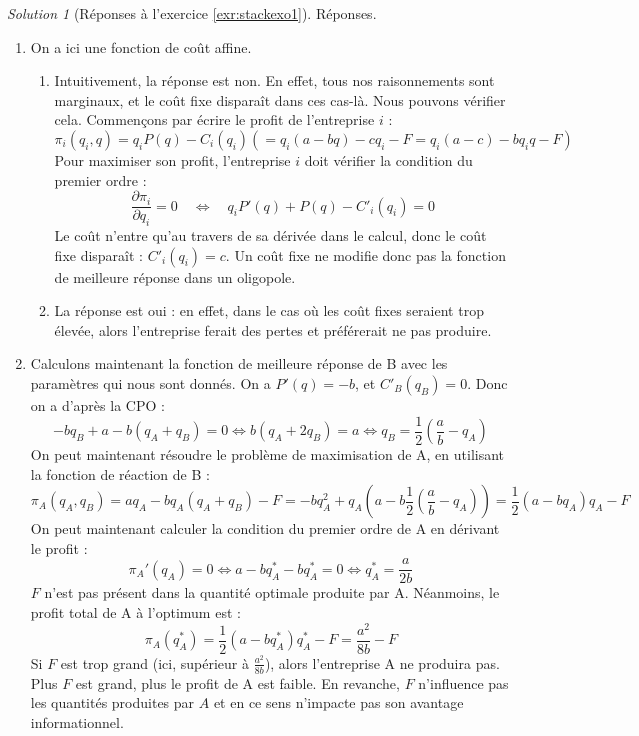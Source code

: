 \documentclass[
]{book}
\providecommand{\tightlist}{%
  \setlength{\itemsep}{0pt}\setlength{\parskip}{0pt}}
\theoremstyle{definition}
\theoremstyle{definition}
\theoremstyle{definition}
\theoremstyle{definition}
\theoremstyle{remark}
\newtheorem*{solution}{Solution}
\begin{document}
\begin{solution}[Réponses à l'exercice \ref{exr:stackexo1}]

Réponses.

\begin{enumerate}
\def\labelenumi{\arabic{enumi}.}
\tightlist
\item
  On a ici une fonction de coût affine.

  \begin{enumerate}
  \def\labelenumii{\alph{enumii}.}
  \tightlist
  \item
    Intuitivement, la réponse est non.
    En effet, tous nos raisonnements sont marginaux, et le coût fixe disparaît dans ces cas-là.
    Nous pouvons vérifier cela.
    Commençons par écrire le profit de l'entreprise \(i\) :
    \[\pi_i(q_i, q)=q_iP(q)-C_i(q_i)(=q_i(a-bq)-cq_i-F=q_i(a-c)-bq_iq-F)\]
    Pour maximiser son profit, l'entreprise \(i\) doit vérifier la condition du premier ordre :
    \[\frac{\partial\pi_i}{\partial q_i}=0\quad \Leftrightarrow \quad q_iP'(q)+P(q)-C'_i(q_i)=0\]
    Le coût n'entre qu'au travers de sa dérivée dans le calcul, donc le coût fixe disparaît : \(C'_i(q_i)=c\).
    Un coût fixe ne modifie donc pas la fonction de meilleure réponse dans un oligopole.
  \item
    La réponse est oui : en effet, dans le cas où les coût fixes seraient trop élevée, alors l'entreprise ferait des pertes et préférerait ne pas produire.
  \end{enumerate}
\item
  Calculons maintenant la fonction de meilleure réponse de B avec les paramètres qui nous sont donnés.
  On a \(P'(q)=-b\), et \(C'_B(q_B)=0\).
  Donc on a d'après la CPO :
  \[-bq_B+a-b(q_A+q_B)=0\Leftrightarrow b(q_A+2q_B)=a\Leftrightarrow q_B=\frac{1}{2}\left(\frac{a}{b}-q_A\right)\]
  On peut maintenant résoudre le problème de maximisation de A, en utilisant la fonction de réaction de B :
  \[\pi_A(q_A, q_B)=aq_A-bq_A(q_A+q_B)-F=-bq_A^2+q_A\left(a-b\frac{1}{2}\left(\frac{a}{b}-q_A\right)\right)=\frac{1}{2}(a-bq_A)q_A-F\]
  On peut maintenant calculer la condition du premier ordre de A en dérivant le profit :
  \[\pi_A'(q_A)=0 \Leftrightarrow  a-bq_A^*-bq_A^*=0\Leftrightarrow q_A^*=\frac{a}{2b}\]
  \(F\) n'est pas présent dans la quantité optimale produite par A.
  Néanmoins, le profit total de A à l'optimum est :
  \[\pi_A(q_A^*)=\frac{1}{2}(a-bq_A^*)q_A^*-F=\frac{a^2}{8b}-F\]
  Si \(F\) est trop grand (ici, supérieur à \(\frac{a^2}{8b}\)), alors l'entreprise A ne produira pas.
  Plus \(F\) est grand, plus le profit de A est faible.
  En revanche, \(F\) n'influence pas les quantités produites par \(A\) et en ce sens n'impacte pas son avantage informationnel.
\end{enumerate}

\end{solution}
\end{document}
